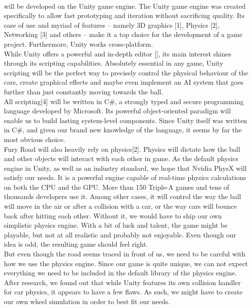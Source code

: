\paragraph{}\FR will be developed on the Unity game engine. The Unity game engine was created specifically to allow fast prototyping and iteration without sacrificing quality. Its ease of use and myriad of features – namely 3D graphics [1], Physics [2], Networking [3] and others – make it a top choice for the development of a game project. Furthermore, Unity works cross-platform.\\

While Unity offers a powerful and in-depth editor [], its main interest shines through its scripting capabilities. Absolutely essential in any game, Unity scripting will be the perfect way to precisely control the physical behaviour of the cars, create graphical effects and maybe even implement an AI system that goes further than just constantly moving towards the ball.\\

All scripting[4] will be written in C\#, a strongly typed and secure programming language developed by Microsoft. Its powerful object-oriented paradigm will enable us to build lasting system-level components. Since Unity itself was written in C\#, and given our brand new knowledge of the language, it seems by far the most obvious choice.\\

Fury Road will also heavily rely on physics[2]. Physics will dictate how the ball and other objects will interact with each other in game. As the default physics engine in Unity, as well as an industry standard, we hope that Nvidia PhysX will satisfy our needs. It is a powerful engine capable of real-time physics calculations on both the CPU and the GPU. More than 150 Triple-A games and tens of thousands developers use it. Among other cases, it will control the way the ball will move in the air or after a collision with a car, or the way cars will bounce back after hitting each other. Without it, we would have to ship our own simplistic physics engine. With a bit of luck and talent, the game might be playable, but not at all realistic and probably not enjoyable. Even though our idea is odd, the resulting game should feel right.\\

But even though the road seems traced in front of us, we need to be careful with how we use the physics engine. Since our game is quite unique, we can not expect everything we need to be included in the default library of the physics engine. After research, we found out that while Unity features its own collision handler for car physics, it appears to have a few flaws. As such, we might have to create our own wheel simulation in order to best fit our needs.\\

